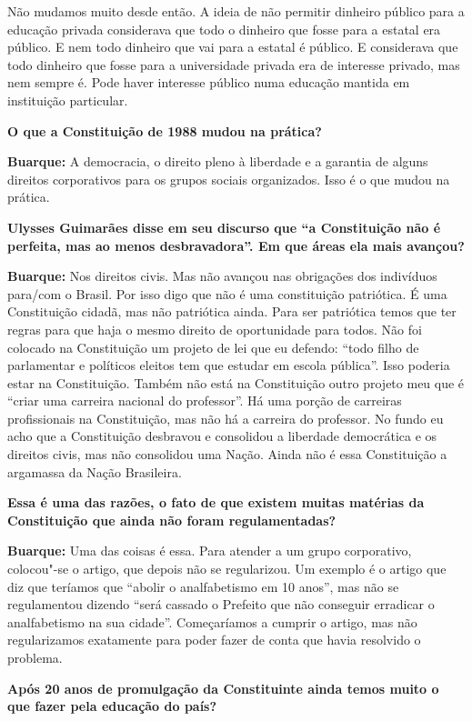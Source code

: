 Não mudamos muito desde então. A ideia de não permitir dinheiro público
para a educação privada considerava que todo o dinheiro que fosse para a
estatal era público. E nem todo dinheiro que vai para a estatal é
público. E considerava que todo dinheiro que fosse para a universidade
privada era de interesse privado, mas nem sempre é. Pode haver interesse
público numa educação mantida em instituição particular.

\textbf{O que a Constituição de 1988 mudou na prática?}

\textbf{Buarque:} A democracia, o direito pleno à liberdade e a garantia
de alguns direitos corporativos para os grupos sociais organizados. Isso
é o que mudou na prática.

\textbf{Ulysses Guimarães disse em seu discurso que ``a Constituição não
é perfeita, mas ao menos desbravadora''. Em que áreas ela mais avançou?}

\textbf{Buarque:} Nos direitos civis. Mas não avançou nas obrigações dos
indivíduos para/com o Brasil. Por isso digo que não é uma constituição
patriótica. É uma Constituição cidadã, mas não patriótica ainda. Para
ser patriótica temos que ter regras para que haja o mesmo direito de
oportunidade para todos. Não foi colocado na Constituição um projeto de
lei que eu defendo: ``todo filho de parlamentar e políticos eleitos tem
que estudar em escola pública''. Isso poderia estar na Constituição.
Também não está na Constituição outro projeto meu que é ``criar uma
carreira nacional do professor''. Há uma porção de carreiras
profissionais na Constituição, mas não há a carreira do professor. No
fundo eu acho que a Constituição desbravou e consolidou a liberdade
democrática e os direitos civis, mas não consolidou uma Nação. Ainda não
é essa Constituição a argamassa da Nação Brasileira.

\textbf{Essa é uma das razões, o fato de que existem muitas matérias da
Constituição que ainda não foram regulamentadas?}

\textbf{Buarque:} Uma das coisas é essa. Para atender a um grupo
corporativo, colocou"-se o artigo, que depois não se regularizou. Um
exemplo é o artigo que diz que teríamos que ``abolir o analfabetismo em
10 anos'', mas não se regulamentou dizendo ``será cassado o Prefeito que
não conseguir erradicar o analfabetismo na sua cidade''. Começaríamos a
cumprir o artigo, mas não regularizamos exatamente para poder fazer de
conta que havia resolvido o problema.

\textbf{Após 20 anos de promulgação da Constituinte ainda temos muito o
que fazer pela educação do país?}

